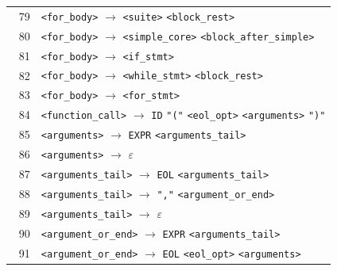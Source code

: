 \documentclass[11pt,a4paper]{article}
\begin{document}
\begin{longtable}{@{}r@{\quad}>{\raggedright\arraybackslash}p{0.91\linewidth}@{}}
79 & \texttt{\textless{}for\_body\textgreater{}} $\rightarrow$ \texttt{\textless{}suite\textgreater{}} \texttt{\textless{}block\_rest\textgreater{}} \\
80 & \texttt{\textless{}for\_body\textgreater{}} $\rightarrow$ \texttt{\textless{}simple\_core\textgreater{}} \texttt{\textless{}block\_after\_simple\textgreater{}} \\
81 & \texttt{\textless{}for\_body\textgreater{}} $\rightarrow$ \texttt{\textless{}if\_stmt\textgreater{}} \\
82 & \texttt{\textless{}for\_body\textgreater{}} $\rightarrow$ \texttt{\textless{}while\_stmt\textgreater{}} \texttt{\textless{}block\_rest\textgreater{}} \\
83 & \texttt{\textless{}for\_body\textgreater{}} $\rightarrow$ \texttt{\textless{}for\_stmt\textgreater{}} \\

84 & \texttt{\textless{}function\_call\textgreater{}} $\rightarrow$ \texttt{ID} \texttt{"("} \texttt{\textless{}eol\_opt\textgreater{}} \texttt{\textless{}arguments\textgreater{}} \texttt{")"} \\
85 & \texttt{\textless{}arguments\textgreater{}} $\rightarrow$ \texttt{EXPR} \texttt{\textless{}arguments\_tail\textgreater{}} \\
86 & \texttt{\textless{}arguments\textgreater{}} $\rightarrow$ $\varepsilon$ \\
87 & \texttt{\textless{}arguments\_tail\textgreater{}} $\rightarrow$ \texttt{EOL} \texttt{\textless{}arguments\_tail\textgreater{}} \\
88 & \texttt{\textless{}arguments\_tail\textgreater{}} $\rightarrow$ \texttt{","} \texttt{\textless{}argument\_or\_end\textgreater{}} \\
89 & \texttt{\textless{}arguments\_tail\textgreater{}} $\rightarrow$ $\varepsilon$ \\
90 & \texttt{\textless{}argument\_or\_end\textgreater{}} $\rightarrow$ \texttt{EXPR} \texttt{\textless{}arguments\_tail\textgreater{}} \\
91 & \texttt{\textless{}argument\_or\_end\textgreater{}} $\rightarrow$ \texttt{EOL} \texttt{\textless{}eol\_opt\textgreater{}} \texttt{\textless{}arguments\textgreater{}} \\
\end{longtable}\endgroup
\clearpage
\end{document}
